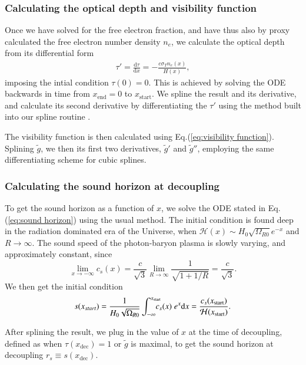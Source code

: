 \documentclass[twocolumn]{aa}
\renewcommand{\d}{\text{d}}
\newcommand{\dd}[2]{\frac{\d #1}{\d #2}}
\begin{document}
\subsubsection{Calculating the optical depth and visibility function}
Once we have solved for the free electron fraction, and have thus also by proxy calculated the free electron number density $n_e$, we calculate the optical depth from its differential form 
\begin{align*}
      \tau' = \dd{\tau}{x} = -\frac{c\sigma_Tn_e(x)}{H(x)},
\end{align*}
imposing the intial condition $\tau(0)=0$. This is achieved by solving the ODE backwards in time from $x_\text{end}=0$ to $x_\text{start}$. We spline the result and its derivative, and calculate its second derivative by differentiating the $\tau'$ using the method built into our spline routine \citep{winther_spline}. 

The visibility function is then calculated using Eq.(\ref{eq:visibility function}). Splining $\tilde{g}$, we then its first two derivatives, $\tilde{g}'$ and $\tilde{g}''$, employing the same differentiating scheme for cubic splines.

\subsubsection{Calculating the sound horizon at decoupling}
To get the sound horizon as a function of $x$, we solve the ODE stated in Eq.(\ref{eq:sound horizon}) using the usual method. The initial condition is found deep in the radiation dominated era of the Universe, when $\mathcal{H}(x)\sim H_0\sqrt{\Omega_{R0}}e^{-x}$ and $R\to \infty$. The sound speed of the photon-baryon plasma is slowly varying, and approximately constant, since 
\begin{equation*}
      \lim_{x\to-\infty} c_s(x) = \frac{c}{\sqrt{3}}\lim_{R\to\infty}\frac{1}{\sqrt{1+1/R}} = \frac{c}{\sqrt{3}}.
\end{equation*}
We then get the initial condition
\begin{equation*}
      s(x_{start}) = \frac{1}{H_0\sqrt{\Omega_{R0}}}\int_{-\infty}^{x_\text{start}}\hspace{-3mm}c_s(x)\;e^x\d x = \frac{c_s(x_\text{start})}{\mathcal{H}(x_\text{start})}.
\end{equation*}

After splining the result, we plug in the value of $x$ at the time of decoupling, defined as when $\tau(x_\text{dec}) = 1$ or $\tilde{g}$ is maximal, to get the sound horizon at decoupling $r_s\equiv s(x_\text{dec})$.
\end{document}
